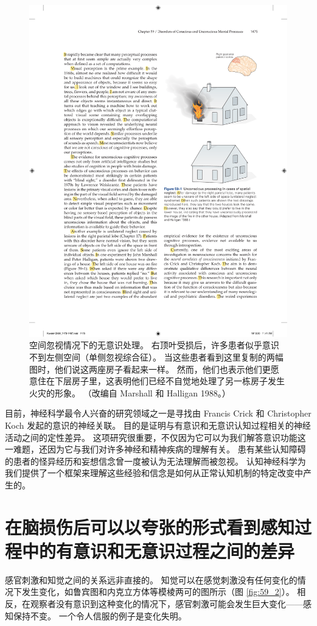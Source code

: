 \begin{figure}[htbp]
	\centering
	\includegraphics[width=0.5\linewidth]{chap59/fig_59_1}
	\caption{空间忽视情况下的无意识处理。 右顶叶受损后，许多患者似乎意识不到左侧空间（单侧忽视综合征）。 当这些患者看到这里复制的两幅图时，他们说这两座房子看起来一样。 然而，他们也表示他们更愿意住在下层房子里，这表明他们已经不自觉地处理了另一栋房子发生火灾的形象。 （改编自 Marshall 和 Halligan 1988。）}
	\label{fig:59_1}
\end{figure}

目前，神经科学最令人兴奋的研究领域之一是寻找由 Francis Crick 和 Christopher Koch 发起的意识的神经关联。 目的是证明与有意识和无意识认知过程相关的神经活动之间的定性差异。 这项研究很重要，不仅因为它可以为我们解答意识功能这一难题，还因为它与我们对许多神经和精神疾病的理解有关。 患有某些认知障碍的患者的怪异经历和妄想信念曾一度被认为无法理解而被忽视。 认知神经科学为我们提供了一个框架来理解这些经验和信念是如何从正常认知机制的特定改变中产生的。


\section{在脑损伤后可以以夸张的形式看到感知过程中的有意识和无意识过程之间的差异}

感官刺激和知觉之间的关系远非直接的。 知觉可以在感觉刺激没有任何变化的情况下发生变化，如鲁宾图和内克立方体等模棱两可的图所示（图 \ref{fig:59_2}）。 相反，在观察者没有意识到这种变化的情况下，感官刺激可能会发生巨大变化——感知保持不变。 一个令人信服的例子是变化失明。

